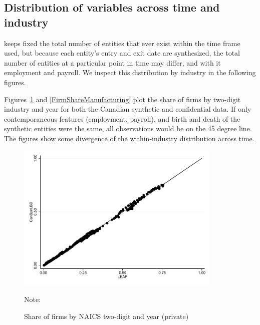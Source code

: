 \subsection{Distribution of variables across time and industry}

\SynLBD{} keeps fixed the total number of entities that ever exist within the time frame used, but because each entity's entry and exit date are synthesized, the total number of entities at a particular point in time may differ, and with it employment and payroll. We inspect this distribution by industry in the following figures. 


Figures~\ref{FirmSharePrivate} and \ref{FirmShareManufacturing} plot the share of firms by two-digit industry and year for both the Canadian synthetic  and confidential data. If only contemporaneous features (employment, payroll), and birth and death of the synthetic entities were the same, all observations would be on the 45 degree line. The figures show some divergence of the within-industry distribution across time. 

\begin{figure} [H]
\centering
\caption{Share of firms by NAICS two-digit and year (private)} \label{FirmSharePrivate}
\includegraphics[height=2.8in, width=.7\linewidth]{graphs/Share_of_firms_by_NAICS_two-digit_and_year_private_bw.pdf} 
\begin{minipage}{0.85\textwidth}
{\footnotesize Note: \TableNote \par}
\end{minipage}
\end{figure}


